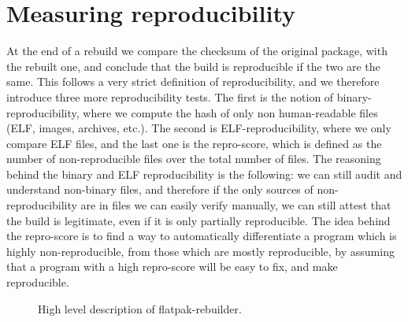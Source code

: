 \documentclass[a4paper,11pt,oneside]{report}
\theoremstyle{definition}
\newcommand{\sysname}{flatpak-rebuilder\xspace}
\begin{document}
\section{Measuring reproducibility}
\label{sec:measure}
At the end of a rebuild we compare the checksum of the original package, with
the rebuilt one, and conclude that the build is reproducible if the two are the
same. This follows a very strict definition of reproducibility, and we
therefore introduce three more reproducibility tests. The first is the notion
of binary-reproducibility, where we compute the hash of only non human-readable
files (ELF, images, archives, etc.). The second is ELF-reproducibility, where we
only compare ELF files, and the last one is the repro-score, which is defined
as the number of non-reproducible files over the total number of files. The
reasoning behind the binary and ELF reproducibility is the following: we can
still audit and understand non-binary files, and therefore if the only sources
of non-reproducibility are in files we can easily verify manually, we can still
attest that the build is legitimate, even if it is only partially reproducible.
The idea behind the repro-score is to find a way to automatically differentiate
a program which is highly non-reproducible, from those which are mostly
reproducible, by assuming that a program with a high repro-score will be easy
to fix, and make reproducible.

\begin{figure}[h]
    \caption{High level description of \sysname.}
    \label{fig:flatpakrebuilder}
\end{figure}
\end{document}

